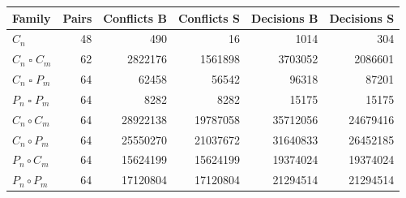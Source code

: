 \begin{tabular}{@{}lrrrrr@{}}
\toprule
Family & Pairs & Conflicts B & Conflicts S & Decisions B & Decisions S\\
\midrule
$C_n$ & 48 & 490 & 16 & 1014 & 304\\
$C_n\mathbin{\square}C_m$ & 62 & 2822176 & 1561898 & 3703052 & 2086601\\
$C_n\mathbin{\square}P_m$ & 64 & 62458 & 56542 & 96318 & 87201\\
$P_n\mathbin{\square}P_m$ & 64 & 8282 & 8282 & 15175 & 15175\\
$C_n\circ C_m$ & 64 & 28922138 & 19787058 & 35712056 & 24679416\\
$C_n\circ P_m$ & 64 & 25550270 & 21037672 & 31640833 & 26452185\\
$P_n\circ C_m$ & 64 & 15624199 & 15624199 & 19374024 & 19374024\\
$P_n\circ P_m$ & 64 & 17120804 & 17120804 & 21294514 & 21294514\\
\bottomrule
\end{tabular}
